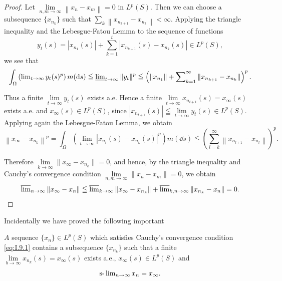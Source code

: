 \begin{proof}
 Let $\lim\limits_{n,m\to\infty}\left\|x_{n}-x_{m}\right\|=0$ in $L^{p}(S)$. Then we can choose a subsequence $\{x_{n_{k}}\}$ such that $\sum\limits_{k}\left\|x_{n_{k+1}}-x_{n_{k}}\right\|<\infty$. Applying the triangle inequality and the Lebesgue-Fatou Lemma to the sequence of functions 
\[
y_{t} (s) = \left| x_ {n_{1}} (s) \right| + \sum\limits_{k=1} ^{t} \left| x_ {n_{k+1}} (s)- x_ {n_{k}} (s) \right| \in L ^{p} (S),
\]
we see that 
\[
\int_{\Omega} \left(\lim\limits_{t \rightarrow \infty} y_{t} (s) ^{p}\right) m (\dd s) \leqq \varliminf\limits_{t \rightarrow \infty} \| y_{t} \| ^{p} \leqq \left(\| x_ {n_{1}} \| + \sum\limits_{k=1} ^{\infty} \| x_ {n_{k+1}}- x_ {n_{k}} \|\right) ^{p}. \]

Thus a finite $\lim\limits_{t\to \infty}y_t(s)$ exists a.e. Hence a finite $\lim\limits_{t\to \infty}x_{n_{t+1}}(s) = x_{\infty}(s)$ exists a.e. and $x_{\infty}(s)\in L^{p}(S)$, since $|x_{n_{t+1}}(s)|\leqq \lim\limits_{t\to \infty}y_t(s)\in L^p(S)$. Applying again the Lebesgue-Fatou Lemma, we obtain 
\[
\left\| x_{\infty}- x_ {n_{k}} \right\| ^{p} = \int_{\Omega} \left(\lim\limits_{t \rightarrow \infty} \left| x_ {n_{t}} (s)- x_ {n_{k}} (s) \right| ^{p}\right) m (\dd s) \leqq \left(\sum\limits_{l=k} ^{\infty} \left\| x_ {n_{l+1}}- x_ {n_{l}} \right\|\right) ^{p}.
\]

Therefore $\lim\limits_{k\to \infty}\|x_{\infty}- x_{n_{k}}\| = 0$, and hence, by the triangle inequality and Cauchy's convergence condition $\lim\limits_{n,m\to \infty}\|x_n- x_m\| = 0$, we obtain 
\[
\varlimsup\limits_{n \rightarrow \infty} \| x_{\infty}- x_{n} \| \leqq \varlimsup\limits_{k \rightarrow \infty} \| x_{\infty}- x_ {n_{k}} \| + \varlimsup\limits_{k, n \rightarrow \infty} \| x_ {n_{k}}- x_{n} \| = 0.
\]
\end{proof}

Incidentally we have proved the following important 

\begin{corollaryu} $A$ sequence $\{x_{n}\} \in L^{p}(S)$ which satisfies Cauchy's convergence condition \eqref{eq:I.9.1} contains a subsequence $\{x_{n_{k}}\}$ such that 
a finite $\lim\limits_{b\to \infty}x_{n_{k}}(s) = x_\infty (s)$ exists a.e., $x_{\infty}(s)\in L^{p}(S)$ and 
\begin{equation}\label{eq:I.9.3}
\slim\limits_{n \rightarrow \infty} x_{n} = x_{\infty}.
\end{equation}
\end{corollaryu}

